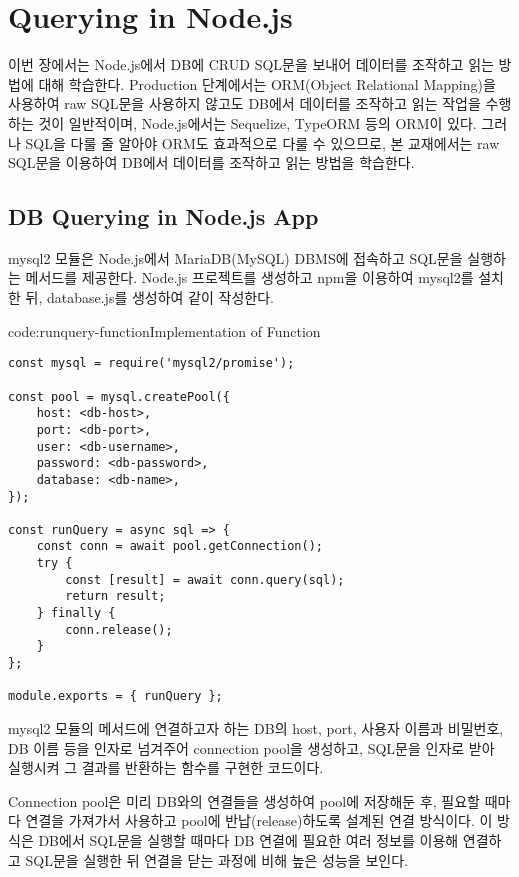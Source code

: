 \section{Querying in Node.js}\label{sect:node-js-db-querying}

이번 장에서는 Node.js에서 DB에 CRUD SQL문을 보내어 데이터를 조작하고 읽는 방법에 대해 학습한다. Production 단계에서는 ORM(Object Relational Mapping)을 사용하여 raw SQL문을 사용하지 않고도 DB에서 데이터를 조작하고 읽는 작업을 수행하는 것이 일반적이며, Node.js에서는 Sequelize, TypeORM 등의 ORM이 있다. 그러나 SQL을 다룰 줄 알아야 ORM도 효과적으로 다룰 수 있으므로, 본 교재에서는 raw SQL문을 이용하여 DB에서 데이터를 조작하고 읽는 방법을 학습한다.

\subsection*{DB Querying in Node.js App}

mysql2 모듈은 Node.js에서 MariaDB(MySQL) DBMS에 접속하고 SQL문을 실행하는 메서드를 제공한다. Node.js 프로젝트를 생성하고 npm을 이용하여 mysql2를 설치한 뒤, database.js를 생성하여 \과 같이 작성한다.

\begin{codeenv}{code:runquery-function}{Implementation of  Function}\begin{verbatim}
const mysql = require('mysql2/promise');

const pool = mysql.createPool({
    host: <db-host>,
    port: <db-port>,
    user: <db-username>,
    password: <db-password>,
    database: <db-name>,
});

const runQuery = async sql => {
    const conn = await pool.getConnection();
    try {
        const [result] = await conn.query(sql);
        return result;
    } finally {
        conn.release();
    }
};

module.exports = { runQuery };
\end{verbatim}
\end{codeenv}

\은 mysql2 모듈의  메서드에 연결하고자 하는 DB의 host, port, 사용자 이름과 비밀번호, DB 이름 등을 인자로 넘겨주어 connection pool을 생성하고, SQL문을 인자로 받아 실행시켜 그 결과를 반환하는  함수를 구현한 코드이다.

Connection pool은 미리 DB와의 연결들을 생성하여 pool에 저장해둔 후, 필요할 때마다 연결을 가져가서 사용하고  pool에 반납(release)하도록 설계된 연결 방식이다. 이 방식은 DB에서 SQL문을 실행할 때마다 DB 연결에 필요한 여러 정보를 이용해 연결하고 SQL문을 실행한 뒤 연결을 닫는 과정에 비해 높은 성능을 보인다.

